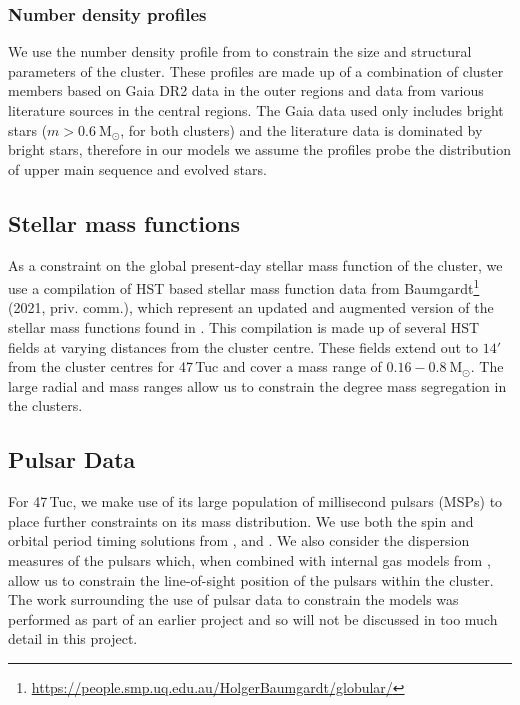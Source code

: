\subsubsection{Number density profiles}
We use the number density profile from \citet{DeBoer2019} to constrain the size and structural
parameters of the cluster. These profiles are made up of a combination of cluster members based on
Gaia DR2 data in the outer regions and data from various literature sources in the central regions.
The Gaia data used only includes bright stars ($m > 0.6 \ \mathrm{M}_\odot$, for both clusters) and
the literature data is dominated by bright stars, therefore in our models we assume the profiles
probe the distribution of upper main sequence and evolved stars.

\subsection{Stellar mass functions}

As a constraint on the global present-day stellar mass function of the cluster, we use a compilation
of HST based stellar mass function data from
Baumgardt\footnote{\url{https://people.smp.uq.edu.au/HolgerBaumgardt/globular/}} (2021, priv.
comm.), which represent an updated and augmented version of the stellar mass functions found in
\citet{Sollima2017}. This compilation is made up of several HST fields at varying distances from the
cluster centre. These fields extend out to $14 '$ from the cluster centres for 47\,Tuc and cover a
mass range of $0.16 - 0.8 \ \mathrm{M}_\odot$. The large radial and mass ranges allow us to
constrain the degree mass segregation in the clusters.

\subsection{Pulsar Data}

For 47\,Tuc, we make use of its large population of millisecond pulsars (MSPs) to place further
constraints on its mass distribution. We use both the spin and orbital period timing solutions from
\citet{Freire2017}, \citet{Ridolfi2016} and \citet{Freire2018}. We also consider the dispersion
measures of the pulsars which, when combined with internal gas models from \citet{Abbate2018}, allow
us to constrain the line-of-sight position of the pulsars within the cluster. The work surrounding
the use of pulsar data to constrain the models was performed as part of an earlier project and so
will not be discussed in too much detail in this project.



